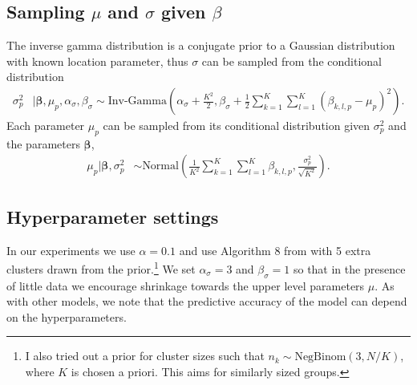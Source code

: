 \subsection{Sampling $\mu$  and $\sigma$ given $\beta$ }

The inverse gamma distribution is a conjugate prior to a Gaussian distribution with known location parameter, thus $\sigma$ can be sampled from the conditional distribution
\begin{align}
\label{eqn:gibbs.sigma}
\sigma_p^2 &| \boldsymbol{\beta}, \mu_p,  \alpha_{\sigma}, \beta_{\sigma} \sim
 \mbox{Inv-Gamma}\left(\alpha_{\sigma} + \frac{K^2}{2}, \beta_{\sigma} + \frac{1}{2} \sum_{k=1}^K\sum_{l=1}^K (\beta_{k,l,p} - \mu_p)^2\right).
\end{align}
Each parameter $\mu_p$ can be sampled from its conditional distribution given $\sigma_p^2$ and the parameters $\boldsymbol{\beta}$,
\begin{align}
\label{eqn:gibbs.mu}
\mu_p | \boldsymbol{\beta},\sigma_p^2 &\sim \mbox{Normal}\left(\frac{1}{K^2}\sum_{k=1}^K \sum_{l=1}^K \beta_{k,l,p},\frac{ \sigma_p^2}{\sqrt{K^2}}\right).
\end{align}

\subsection{Hyperparameter settings}
In our experiments we use $\alpha=0.1$ and use Algorithm 8 from \cite{Neal2000} with 5 extra clusters drawn from the prior.\footnote{I also tried out a prior for cluster sizes such that $n_k \sim \mbox{NegBinom}(3,N/K)$, where $K$ is chosen a priori.  This aims for similarly sized groups.}
We set $\alpha_{\sigma}=3$ and $\beta_{\sigma}=1$ so that in the presence of little data we encourage shrinkage towards the upper level parameters $\mu$.  
As with other models, we note that the predictive accuracy of the model can depend on the hyperparameters.
